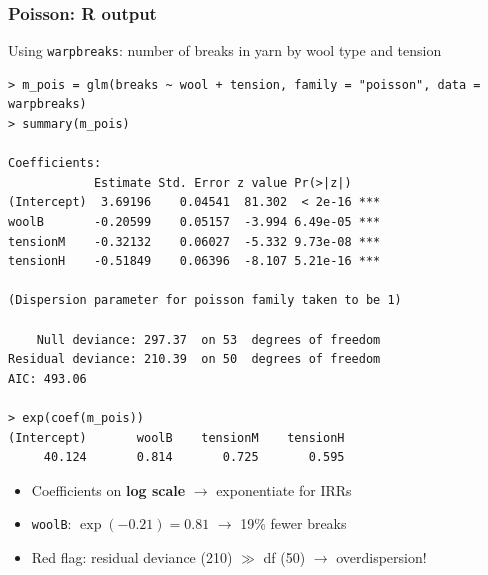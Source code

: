 \begin{frame}[fragile]
\frametitle{Poisson: R output}
\centering

\vspace{2pt}
{\scriptsize Using \texttt{warpbreaks}: number of breaks in yarn by wool type and tension}

\vspace{4pt}

{\fontsize{4.5pt}{5.5pt}\selectfont
\begin{verbatim}
> m_pois = glm(breaks ~ wool + tension, family = "poisson", data = warpbreaks)
> summary(m_pois)

Coefficients:
            Estimate Std. Error z value Pr(>|z|)
(Intercept)  3.69196    0.04541  81.302  < 2e-16 ***
woolB       -0.20599    0.05157  -3.994 6.49e-05 ***
tensionM    -0.32132    0.06027  -5.332 9.73e-08 ***
tensionH    -0.51849    0.06396  -8.107 5.21e-16 ***

(Dispersion parameter for poisson family taken to be 1)

    Null deviance: 297.37  on 53  degrees of freedom
Residual deviance: 210.39  on 50  degrees of freedom
AIC: 493.06

> exp(coef(m_pois))
(Intercept)       woolB    tensionM    tensionH
     40.124       0.814       0.725       0.595
\end{verbatim}
}

\vspace{4pt}

\begin{itemize}
\item {\small Coefficients on \textbf{log scale} $\to$ exponentiate for IRRs}
\item {\small \texttt{woolB}: $\exp(-0.21) = 0.81$ $\to$ 19\% fewer breaks}
\item {\small \alert{Red flag}: residual deviance (210) $\gg$ df (50) $\to$ overdispersion!}
\end{itemize}

\end{frame}

